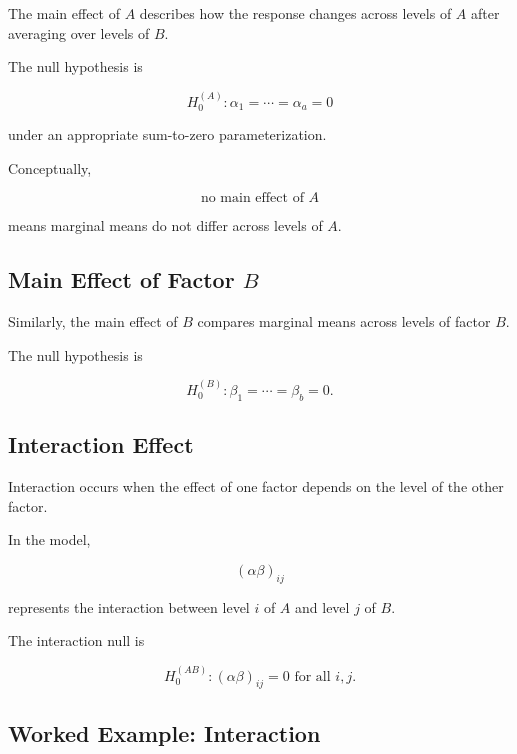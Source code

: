 The main effect of \(A\) describes how the response changes across levels
of \(A\) after averaging over levels of \(B\).

The null hypothesis is

\[
\boxed{
H_0^{(A)}:
\alpha_1=\cdots=\alpha_a=0
}
\]

under an appropriate sum-to-zero parameterization.

Conceptually,

\[
\boxed{
\text{no main effect of }A
}
\]

means marginal means do not differ across levels of \(A\).

\subsection{Main Effect of Factor \(B\)}
\label{subsec:main-effect-b}

Similarly, the main effect of \(B\) compares marginal means across levels
of factor \(B\).

The null hypothesis is

\[
\boxed{
H_0^{(B)}:
\beta_1=\cdots=\beta_b=0.
}
\]

\subsection{Interaction Effect}
\label{subsec:anova-interaction}

Interaction occurs when the effect of one factor depends on the level of
the other factor.

In the model,

\[
\boxed{
(\alpha\beta)_{ij}
}
\]

represents the interaction between level \(i\) of \(A\) and level \(j\)
of \(B\).

The interaction null is

\[
\boxed{
H_0^{(AB)}:
(\alpha\beta)_{ij}=0
\text{ for all }i,j.
}
\]

\subsection{Worked Example: Interaction}
\label{subsec:worked-anova-interaction}

